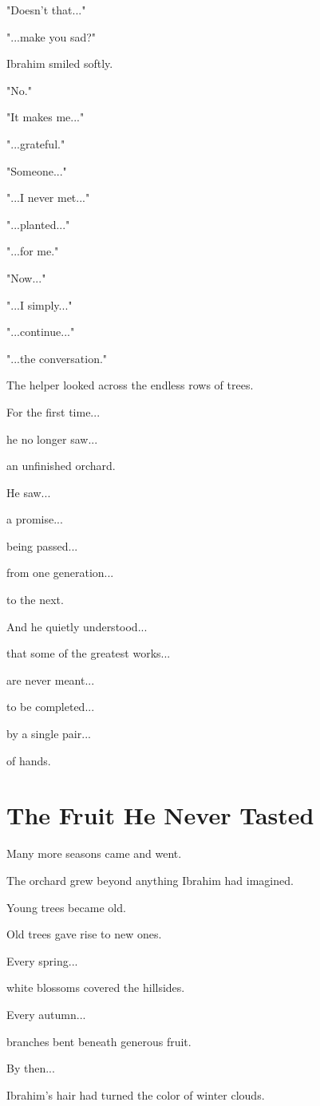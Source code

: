 \documentclass[12pt,openany]{book}
\begin{document}
"Doesn't that..."

"...make you sad?"

Ibrahim smiled softly.

"No."

"It makes me..."

"...grateful."

"Someone..."

"...I never met..."

"...planted..."

"...for me."

"Now..."

"...I simply..."

"...continue..."

"...the conversation."

The helper looked across the endless rows of trees.

For the first time...

he no longer saw...

an unfinished orchard.

He saw...

a promise...

being passed...

from one generation...

to the next.

And he quietly understood...

that some of the greatest works...

are never meant...

to be completed...

by a single pair...

of hands.
\section*{The Fruit He Never Tasted}

Many more seasons came and went.

The orchard grew beyond anything Ibrahim had imagined.

Young trees became old.

Old trees gave rise to new ones.

Every spring...

white blossoms covered the hillsides.

Every autumn...

branches bent beneath generous fruit.

By then...

Ibrahim's hair had turned the color of winter clouds.
\end{document}
